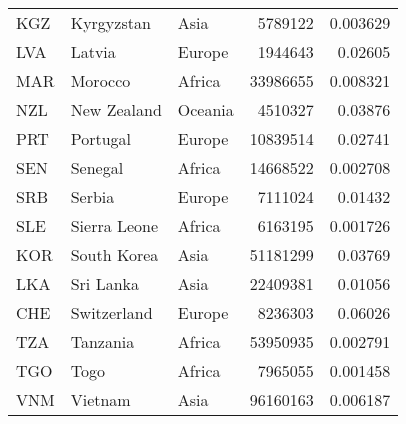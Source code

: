 \begin{table}[h!]
\begin{tabular}{lllrr}
        KGZ     & Kyrgyzstan    & Asia          & 5789122   & 0.003629      \\
        LVA     & Latvia        & Europe        & 1944643   & 0.02605       \\
        MAR     & Morocco       & Africa        & 33986655  & 0.008321      \\
        NZL     & New Zealand   & Oceania       & 4510327   & 0.03876       \\
        PRT     & Portugal      & Europe        & 10839514  & 0.02741       \\
        SEN     & Senegal       & Africa        & 14668522  & 0.002708      \\
        SRB     & Serbia        & Europe        & 7111024   & 0.01432       \\
        SLE     & Sierra Leone  & Africa        & 6163195   & 0.001726      \\
        KOR     & South Korea   & Asia          & 51181299  & 0.03769       \\
        LKA     & Sri Lanka     & Asia          & 22409381  & 0.01056       \\
        CHE     & Switzerland   & Europe        & 8236303   & 0.06026       \\
        TZA     & Tanzania      & Africa        & 53950935  & 0.002791      \\
        TGO     & Togo          & Africa        & 7965055   & 0.001458      \\
        VNM     & Vietnam       & Asia          & 96160163  & 0.006187      \\
        \bottomrule
    \end{tabular}
\end{table}

